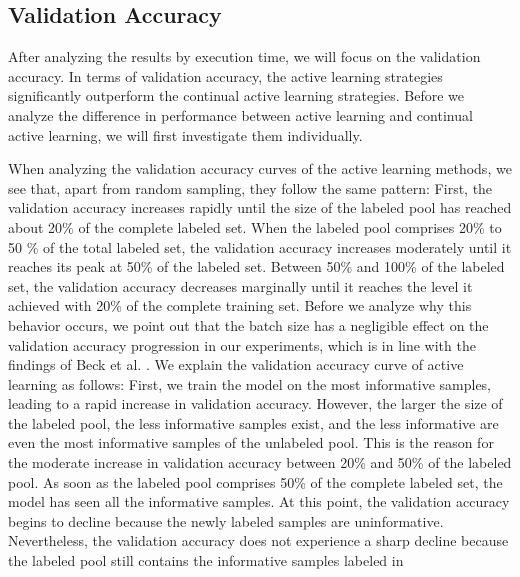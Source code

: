 \subsection{Validation Accuracy}
\label{sec:Discussion:ValidationAccuracy}
After analyzing the results by execution time, we will focus on the validation accuracy. In terms of validation accuracy, the active learning strategies
significantly outperform the continual active learning strategies. Before we analyze the difference in performance between active learning and continual
active learning, we will first investigate them individually. \par
When analyzing the validation accuracy curves of the active learning methods, we see that, apart from random sampling, they follow the same
pattern: First, the validation accuracy increases rapidly until the size of the labeled pool has reached about 20\% of the complete labeled set. When the labeled
pool comprises 20\% to 50 \% of the total labeled set, the validation accuracy increases moderately until it reaches its peak at 50\% of the labeled set. Between
50\% and 100\% of the labeled set, the validation accuracy decreases marginally until it reaches the level it achieved with 20\% of the complete training set. Before
we analyze why this behavior occurs, we point out that the batch size has a negligible effect on the validation accuracy progression in our experiments, which
is in line with the findings of Beck et al. \cite{beck2021effective}. We explain the validation accuracy curve of active learning as follows: First, we
train the model on the most informative samples, leading to a rapid increase in validation accuracy. However, the larger the size of the labeled pool, the
less informative samples exist, and the less informative are even the most informative samples of the unlabeled pool. This is the reason for the moderate
increase in validation accuracy between 20\% and 50\% of the labeled pool. As soon as the labeled pool comprises 50\% of the complete labeled set,
the model has seen all the informative samples. At this point, the validation accuracy begins to decline because the newly labeled samples are uninformative.
Nevertheless, the validation accuracy does not experience a sharp decline because the labeled pool still contains the informative samples labeled in
